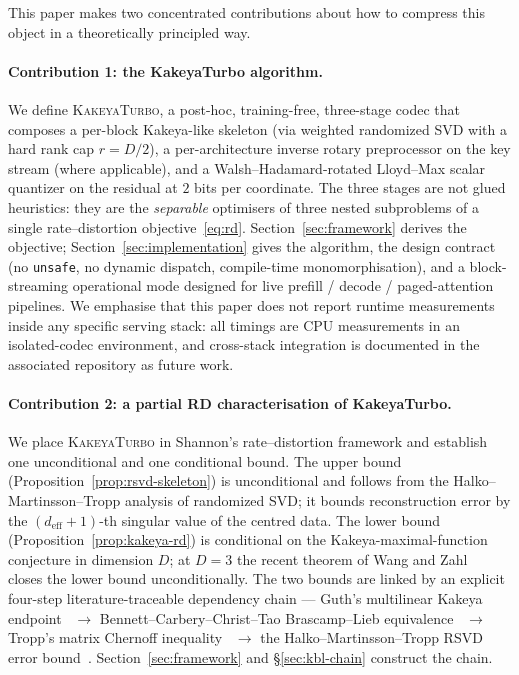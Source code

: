 \documentclass[11pt,a4paper]{article}
\theoremstyle{definition}
\theoremstyle{plain}
\begin{document}
This paper makes two concentrated contributions about how to compress this object in a theoretically principled way.

\paragraph{Contribution 1: the KakeyaTurbo algorithm.}
We define \textsc{KakeyaTurbo}, a post-hoc, training-free, three-stage codec that composes a per-block Kakeya-like skeleton (via weighted randomized SVD with a hard rank cap $r = D/2$), a per-architecture inverse rotary preprocessor on the key stream (where applicable), and a Walsh--Hadamard-rotated Lloyd--Max scalar quantizer on the residual at $2$ bits per coordinate. The three stages are not glued heuristics: they are the \emph{separable} optimisers of three nested subproblems of a single rate--distortion objective~\eqref{eq:rd}. Section~\ref{sec:framework} derives the objective; Section~\ref{sec:implementation} gives the algorithm, the design contract (no \texttt{unsafe}, no dynamic dispatch, compile-time monomorphisation), and a block-streaming operational mode designed for live prefill / decode / paged-attention pipelines. We emphasise that this paper does not report runtime measurements inside any specific serving stack: all timings are CPU measurements in an isolated-codec environment, and cross-stack integration is documented in the associated repository as future work.

\paragraph{Contribution 2: a partial RD characterisation of KakeyaTurbo.}
We place \textsc{KakeyaTurbo} in Shannon's rate--distortion framework and establish one unconditional and one conditional bound. The upper bound (Proposition~\ref{prop:rsvd-skeleton}) is unconditional and follows from the Halko--Martinsson--Tropp analysis of randomized SVD; it bounds reconstruction error by the $(d_{\text{eff}}+1)$-th singular value of the centred data. The lower bound (Proposition~\ref{prop:kakeya-rd}) is conditional on the Kakeya-maximal-function conjecture in dimension $D$; at $D = 3$ the recent theorem of Wang and Zahl~\cite{wang-zahl} closes the lower bound unconditionally. The two bounds are linked by an explicit four-step literature-traceable dependency chain --- Guth's multilinear Kakeya endpoint~\cite{guth-endpoint} $\to$ Bennett--Carbery--Christ--Tao Brascamp--Lieb equivalence~\cite{bennett-carbery-christ-tao} $\to$ Tropp's matrix Chernoff inequality~\cite{tropp-matrix-chernoff} $\to$ the Halko--Martinsson--Tropp RSVD error bound~\cite{halko-martinsson-tropp}. Section~\ref{sec:framework} and \S\ref{sec:kbl-chain} construct the chain.
\end{document}
